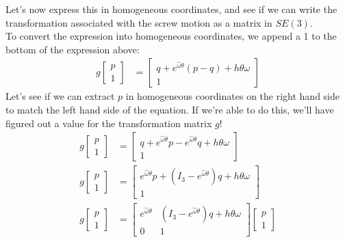 \documentclass[oneside]{book}
\begin{document}
Let's now express this in homogeneous coordinates, and see if we can write the transformation associated with the screw motion as a matrix in $SE(3)$.\\
To convert the expression into homogeneous coordinates, we append a 1 to the bottom of the expression above:
\begin{align}
    g\begin{bmatrix}
    p\\
    1
    \end{bmatrix}
    &= 
    \begin{bmatrix}
    q + e^{\hat\omega\theta}(p-q) + h\theta\omega\\
    1
    \end{bmatrix}
\end{align}
Let's see if we can extract $p$ in homogeneous coordinates on the right hand side to match the left hand side of the equation. If we're able to do this, we'll have figured out a value for the transformation matrix $g$!
\begin{align}
    g\begin{bmatrix}
    p\\
    1
    \end{bmatrix}
    &= 
    \begin{bmatrix}
    q + e^{\hat\omega\theta}p-e^{\hat\omega\theta}q + h\theta\omega\\
    1
    \end{bmatrix}\\
     g\begin{bmatrix}
    p\\
    1
    \end{bmatrix}
    &= 
    \begin{bmatrix}
    e^{\hat\omega\theta}p + (I_3 -e^{\hat\omega\theta})q + h\theta\omega \\
    1
    \end{bmatrix}\\
     g\begin{bmatrix}
    p\\
    1
    \end{bmatrix}
    &= 
    \begin{bmatrix}
    e^{\hat\omega\theta} & (I_3 -e^{\hat\omega\theta})q + h\theta\omega \\
    0 & 1
    \end{bmatrix}
    \begin{bmatrix}
    p\\
    1
    \end{bmatrix}
\end{align}
\end{document}
